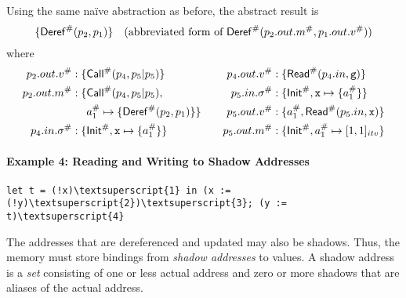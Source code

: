 \documentclass{article}
\begin{document}
\vspace{\topsep}
Using the same na\"ive abstraction as before, the abstract result is
\[\{{\mathsf{Deref}}^{\#}(p_2,p_1)\}\quad(\text{abbreviated form of }{\mathsf{Deref}}^{\#}(p_2.{out}.{m}^{\#},p_1.{out}.{v}^{\#}))\]
where
\begin{align*}
  p_2.{out}.{v}^{\#} :\{  & {\mathsf{Call}}^{\#}(p_4,p_5|p_5)\}                        &  &  & p_4.{out}.{v}^{\#}:\{  & {\mathsf{Read}}^{\#}(p_4.{in},\texttt{g})\}                      \\
  p_2.{out}.{m}^{\#} :\{ & {\mathsf{Call}}^{\#}(p_4,p_5|p_5),                         &  &  & p_5.{in}.{\sigma}^{\#} :\{ & {\mathsf{Init}}^{\#},\texttt{x}\mapsto\{{{a}}^{\#}_1\}\}                \\
                                        & {{a}}^{\#}_1\mapsto\{{\mathsf{Deref}}^{\#}(p_2,p_1)\}\} &  &  & p_5.{out}.{v}^{\#}:\{  & {{a}}^{\#}_1,{\mathsf{Read}}^{\#}(p_5.{in},\texttt{x})\} \\
  p_4.{in}.{\sigma}^{\#} :\{  & {\mathsf{Init}}^{\#},\texttt{x}\mapsto\{{{a}}^{\#}_1\}\}             &  &  & p_5.{out}.{m}^{\#}:\{ & {\mathsf{Init}}^{\#},{{a}}^{\#}_1\mapsto[1,1]_{{itv}}\}
\end{align*}

\paragraph{Example 4: Reading and Writing to Shadow Addresses}
\begin{center}
  \begin{BVerbatim}[commandchars=\\\{\}]
let t = (!x)\textsuperscript{1} in (x := (!y)\textsuperscript{2})\textsuperscript{3}; (y := t)\textsuperscript{4}
  \end{BVerbatim}
\end{center}

The addresses that are dereferenced and updated may also be shadows.
Thus, the memory must store bindings from \emph{shadow addresses} to values.
A shadow address is a \emph{set} consisting of one or less actual address and zero
or more shadows that are aliases of the actual address.
\end{document}
